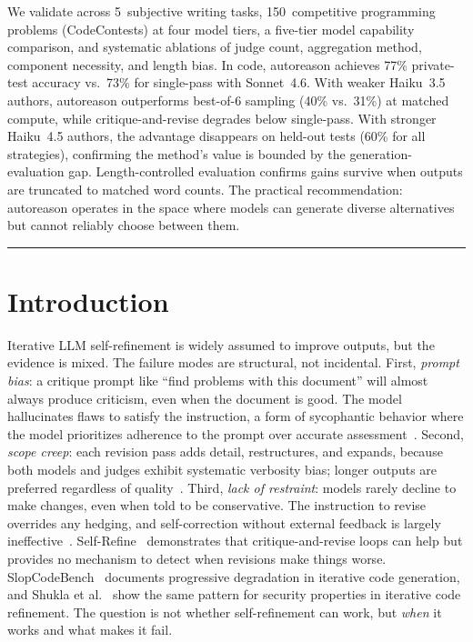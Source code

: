 \documentclass[11pt]{article}
\begin{document}
We validate across 5~subjective writing tasks, 150~competitive programming problems (CodeContests) at four model tiers, a five-tier model capability comparison, and systematic ablations of judge count, aggregation method, component necessity, and length bias. In code, autoreason achieves 77\% private-test accuracy vs.\ 73\% for single-pass with Sonnet~4.6. With weaker Haiku~3.5 authors, autoreason outperforms best-of-6 sampling (40\% vs.\ 31\%) at matched compute, while critique-and-revise degrades below single-pass. With stronger Haiku~4.5 authors, the advantage disappears on held-out tests (60\% for all strategies), confirming the method's value is bounded by the generation-evaluation gap. Length-controlled evaluation confirms gains survive when outputs are truncated to matched word counts. The practical recommendation: autoreason operates in the space where models can generate diverse alternatives but cannot reliably choose between them.

\vspace{10pt}
\hrule
\vspace{12pt}

\section{Introduction}

Iterative LLM self-refinement is widely assumed to improve outputs, but the evidence is mixed. The failure modes are structural, not incidental. First, \textit{prompt bias}: a critique prompt like ``find problems with this document'' will almost always produce criticism, even when the document is good. The model hallucinates flaws to satisfy the instruction, a form of sycophantic behavior where the model prioritizes adherence to the prompt over accurate assessment~\cite{sycophancy_survey,sycophancy_pinpoint}. Second, \textit{scope creep}: each revision pass adds detail, restructures, and expands, because both models and judges exhibit systematic verbosity bias; longer outputs are preferred regardless of quality~\cite{length_bias,verbosity_bias}. Third, \textit{lack of restraint}: models rarely decline to make changes, even when told to be conservative. The instruction to revise overrides any hedging, and self-correction without external feedback is largely ineffective~\cite{huang2023,selfcorrect_decompose}. Self-Refine~\cite{selfrefine} demonstrates that critique-and-revise loops can help but provides no mechanism to detect when revisions make things worse. SlopCodeBench~\cite{slopcodebench} documents progressive degradation in iterative code generation, and Shukla et al.~\cite{security_degrade} show the same pattern for security properties in iterative code refinement. The question is not whether self-refinement can work, but \textit{when} it works and what makes it fail.
\end{document}
